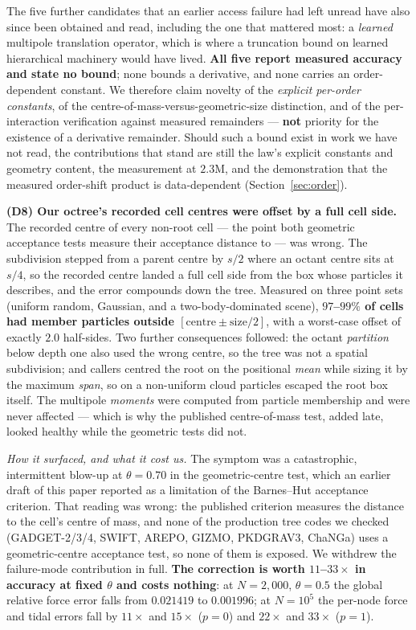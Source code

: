 The five further candidates that an earlier access failure had left unread have also since been
obtained and read, including the one that mattered most: a \emph{learned} multipole
translation operator, which is where a truncation bound on learned hierarchical machinery would have
lived. \textbf{All five report measured accuracy and state no bound}; none bounds a derivative, and
none carries an order-dependent constant. We therefore claim novelty of the
\emph{explicit per-order
constants}, of the centre-of-mass-versus-geometric-size distinction, and of the per-interaction
verification against measured remainders --- \textbf{not} priority for the existence of a derivative
remainder. Should such a bound exist in work we have not read, the contributions that stand are still
the law's explicit constants and geometry content, the measurement at $2.3$M, and the demonstration
that the measured order-shift product is data-dependent (Section~\ref{sec:order}).

\noindent\textbf{(D8) Our octree's recorded cell centres were offset by a full cell side.} The
recorded centre of every non-root cell --- the point both geometric acceptance tests measure their
acceptance distance to --- was wrong. The subdivision stepped from a parent centre by $s/2$ where an
octant centre sits at $s/4$, so the recorded centre landed a full cell side from the box whose
particles it describes, and the error compounds down the tree. Measured on three point sets
(uniform random, Gaussian, and a two-body-dominated scene), \textbf{$97$--$99\%$ of cells had member
particles outside $[\text{centre}\pm\text{size}/2]$}, with a worst-case offset of exactly $2.0$
half-sides. Two further consequences followed: the octant \emph{partition} below depth one also used
the wrong centre, so the tree was not a spatial subdivision; and callers centred the root on the
positional \emph{mean} while sizing it by the maximum \emph{span}, so on a non-uniform cloud
particles escaped the root box itself. The multipole \emph{moments} were computed from particle
membership and were never affected --- which is why the published centre-of-mass test, added late,
looked healthy while the geometric tests did not.

\emph{How it surfaced, and what it cost us.} The symptom was a catastrophic, intermittent blow-up at
$\theta=0.70$ in the geometric-centre test, which an earlier draft of this paper reported as a
limitation of the Barnes--Hut acceptance criterion. That reading was wrong: the published criterion
measures the distance to the cell's centre of mass, and none of the production tree codes we checked
(GADGET-2/3/4, SWIFT, AREPO, GIZMO, PKDGRAV3, ChaNGa) uses a geometric-centre acceptance test, so
none of them is exposed. We withdrew the failure-mode contribution in full. \textbf{The correction is
worth $11$--$33\times$ in accuracy at fixed $\theta$ and costs nothing}: at $N=2{,}000$, $\theta=0.5$
the global relative force error falls from $0.021419$ to $0.001996$; at $N=10^{5}$ the per-node force
and tidal errors fall by $11\times$ and $15\times$ ($p{=}0$) and $22\times$ and $33\times$ ($p{=}1$).

